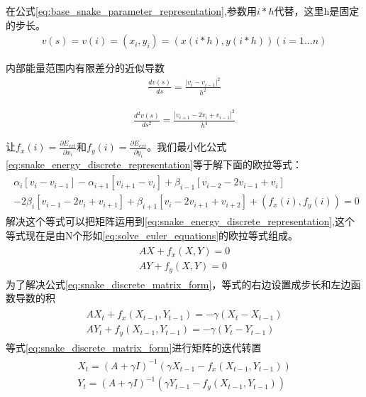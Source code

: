 在公式\eqref{eq:base_snake_parameter_representation},参数用$i*h$代替，这里h是固定的步长。
\begin{align}\label{eq:snake_parameter_discrete_representation}
v(s)=v(i)=(x_{i},y_{i})=(x(i*h),y(i*h)) (i=1 \ldots n)
\end{align}

内部能量范围内有限差分的近似导数
\begin{align}\label{eq:simple_parameter_derivative_first_order}
\frac{dv(s)}{ds} = \frac{|v_{i}-v_{i-1}|^{2}}{h^{2}}
\end{align}

\begin{align}\label{eq:simple_parameter_derivative_second_order}
\frac{d^{2}v(s)}{ds^{2}} = \frac{|v_{i+1}-2v_{i}+v_{i-1}|^{2}}{h^{4}}
\end{align}

让$f_{x}(i)=\frac{\partial E_{ext}}{\partial x_{i}}$和$f_{y}(i)=\frac{\partial
E_{ext}}{\partial
y_{i}}$。我们最小化公式\eqref{eq:snake_energy_discrete_representation}等于解下面的欧拉等式：
\begin{align}\label{eq:solve_euler_equations}
\begin{split}
\alpha_{i}[v_{i}-v_{i-1}] - \alpha_{i+1}[v_{i+1} -v_{i}]
+\beta_{i-1}[v_{i-2}-2v_{i-1}+v_{i}]\\
-2\beta_{i}[v_{i-1}-2v_{i}+v_{i+1}]+\beta_{i+1}[v_{i}-2v_{i+1}+v_{i+2}]+(f_{x}(i),f_{y}(i))=0
\end{split}
\end{align}
解决这个等式可以把矩阵运用到\eqref{eq:snake_energy_discrete_representation},这个等式现在是由N个形如\eqref{eq:solve_euler_equations}的欧拉等式组成。
\begin{align}\label{eq:snake_discrete_matrix_form}
\begin{split}
AX+f_{x}(X,Y)=0\\
AY+f_{y}(X,Y)=0
\end{split}
\end{align}
为了解决公式\eqref{eq:snake_discrete_matrix_form}，等式的右边设置成步长和左边函数导数的积
\begin{align}\label{eq:snake_discrete_matrix_form_solve}
\begin{split}
AX_{t}+f_{x}(X_{t-1},Y_{t-1})=-\gamma(X_{t}-X_{t-1})   \\
AY_{t}+f_{y}(X_{t-1},Y_{t-1})=-\gamma(Y_{t}-Y_{t-1})
\end{split}
\end{align}
等式\eqref{eq:snake_discrete_matrix_form}进行矩阵的迭代转置
\begin{align}\label{eq:snake_discrete_matrix_form_solve}
\begin{split}
X_{t}=(A+\gamma I)^{-1}(\gamma X_{t-1} - f_{x}(X_{t-1},Y_{t-1}))\\
Y_{t}=(A+\gamma I)^{-1}(\gamma Y_{t-1} - f_{y}(X_{t-1},Y_{t-1}))
\end{split}
\end{align}


